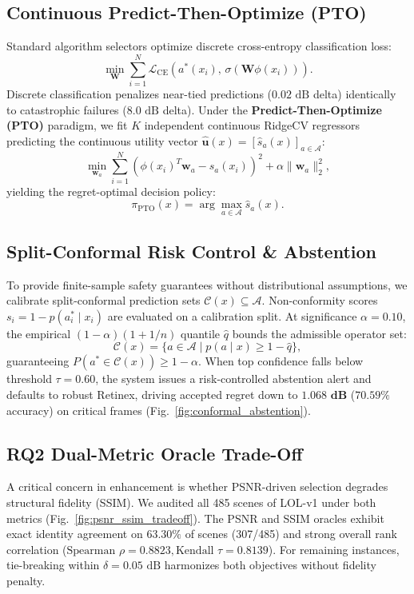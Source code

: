 \documentclass[journal]{IEEEtran}
\begin{document}
\subsection{Continuous Predict-Then-Optimize (PTO)}
Standard algorithm selectors optimize discrete cross-entropy classification loss:
\begin{equation}
\min_{\mathbf{W}} \sum_{i=1}^N \mathcal{L}_{\text{CE}}\left( a^*(x_i),\, \sigma(\mathbf{W} \phi(x_i)) \right).
\end{equation}
Discrete classification penalizes near-tied predictions ($0.02\text{ dB}$ delta) identically to catastrophic failures ($8.0\text{ dB}$ delta). Under the \textbf{Predict-Then-Optimize (PTO)} paradigm, we fit $K$ independent continuous RidgeCV regressors predicting the continuous utility vector $\hat{\mathbf{u}}(x) = [\hat{s}_a(x)]_{a \in \mathcal{A}}$:
\begin{equation}
\min_{\mathbf{w}_a} \sum_{i=1}^N \left( \phi(x_i)^T \mathbf{w}_a - s_a(x_i) \right)^2 + \alpha \|\mathbf{w}_a\|_2^2,
\end{equation}
yielding the regret-optimal decision policy:
\begin{equation}
\pi_{\text{PTO}}(x) = \arg\max_{a \in \mathcal{A}} \hat{s}_a(x).
\label{eq:pto_policy}
\end{equation}

\subsection{Split-Conformal Risk Control \& Abstention}
To provide finite-sample safety guarantees without distributional assumptions, we calibrate split-conformal prediction sets $\mathcal{C}(x) \subseteq \mathcal{A}$. Non-conformity scores $s_i = 1 - p(a_i^* \mid x_i)$ are evaluated on a calibration split. At significance $\alpha = 0.10$, the empirical $(1-\alpha)(1 + 1/n)$ quantile $\hat{q}$ bounds the admissible operator set:
\begin{equation}
\mathcal{C}(x) = \{a \in \mathcal{A} \mid p(a \mid x) \ge 1 - \hat{q}\},
\end{equation}
guaranteeing $P(a^* \in \mathcal{C}(x)) \ge 1 - \alpha$. When top confidence falls below threshold $\tau = 0.60$, the system issues a risk-controlled abstention alert and defaults to robust Retinex, driving accepted regret down to $\mathbf{1.068\text{ dB}}$ ($70.59\%$ accuracy) on critical frames (Fig.~\ref{fig:conformal_abstention}).

\subsection{RQ2 Dual-Metric Oracle Trade-Off}
A critical concern in enhancement is whether PSNR-driven selection degrades structural fidelity (SSIM). We audited all 485 scenes of LOL-v1 under both metrics (Fig.~\ref{fig:psnr_ssim_tradeoff}). The PSNR and SSIM oracles exhibit exact identity agreement on $\mathbf{63.30\%}$ of scenes (307/485) and strong overall rank correlation ($\text{Spearman } \rho = \mathbf{0.8823}, \text{Kendall } \tau = \mathbf{0.8139}$). For remaining instances, tie-breaking within $\delta=0.05\text{ dB}$ harmonizes both objectives without fidelity penalty.
\end{document}
